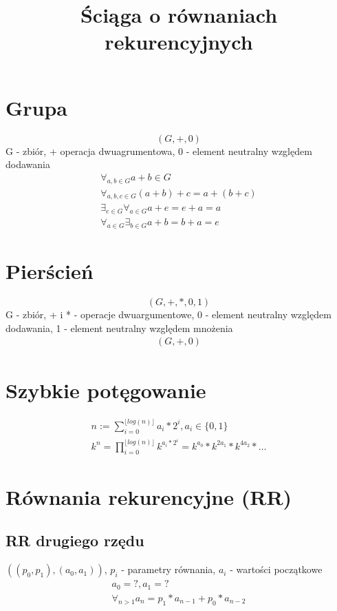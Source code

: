 \documentclass{article}
\begin{document}
\title{Ściąga o równaniach rekurencyjnych}

\maketitle

\section{Grupa}
\begin{displaymath}
	(G, +, 0)
\end{displaymath}
G - zbiór, + operacja dwuagrumentowa, 0 - element neutralny względem dodawania
\begin{gather}
\forall_{a, b \in G} a + b \in G \\
\forall_{a, b, c \in G} (a + b) + c = a + (b + c) \\
\exists_{e \in G} \forall_{a \in G} a + e = e + a = a \\
\forall_{a \in G} \exists_{b \in G} a + b = b + a = e
\end{gather}

\section{Pierścień}
\begin{displaymath}
	(G, +, *, 0, 1)
\end{displaymath}
G - zbiór, + i * - operacje dwuargumentowe, 0 - element neutralny względem dodawania, 1 - element neutralny względem mnożenia
\begin{gather}
	(G, +, 0)	
\end{gather}

\section{Szybkie potęgowanie}
\begin{gather}
	n := \sum_{i=0}^{\lfloor log(n) \rfloor} a_i * 2^i, a_i \in \{0, 1\} \\
	k^n = \prod_{i=0}^{\lfloor log(n) \rfloor} k^{a_i * 2^i} = k^{a_0} * k^{2a_1} * k^{4a_2} * \dots
\end{gather}

\section{Równania rekurencyjne (RR)}
\subsection {RR drugiego rzędu}
$((p_0, p_1), (a_0, a_1))$,  $ p_i $ - parametry równania, $a_i $ - wartości początkowe
\begin{gather}
a_0 = ?, a_1 = ? \\
\forall_{n > 1}a_n = p_1 * a_{n-1} + p_0 * a_{n-2}
\end{gather}
\end{document}

